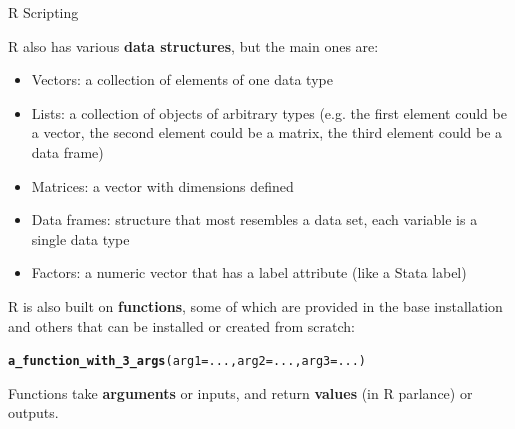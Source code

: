 \documentclass[svgnames,smaller]{beamer}\usepackage[]{graphicx}\usepackage[]{color}
\makeatletter
\newcommand{\hlstd}[1]{\textcolor[rgb]{0.345,0.345,0.345}{#1}}%
\newcommand{\hlkwc}[1]{\textcolor[rgb]{0.333,0.667,0.333}{#1}}%
\newcommand{\hlkwd}[1]{\textcolor[rgb]{0.737,0.353,0.396}{\textbf{#1}}}%
\newenvironment{kframe}{%
 \def\at@end@of@kframe{}%
 \ifinner\ifhmode%
  \def\at@end@of@kframe{\end{minipage}}%
  \begin{minipage}{\columnwidth}%
 \fi\fi%
 \def\FrameCommand##1{\hskip\@totalleftmargin \hskip-\fboxsep
 \colorbox{shadecolor}{##1}\hskip-\fboxsep
     \hskip-\linewidth \hskip-\@totalleftmargin \hskip\columnwidth}%
 \MakeFramed {\advance\hsize-\width
   \@totalleftmargin\z@ \linewidth\hsize
   \@setminipage}}%
 {\par\unskip\endMakeFramed%
 \at@end@of@kframe}
\newenvironment{knitrout}{}{} %
\makeatother
\begin{document}
\begin{frame}[fragile]{R Scripting}

R also has various \textbf{data structures}, but the main ones are:
\begin{itemize}
    \item Vectors: a collection of elements of one data type
    \item Lists: a collection of objects of arbitrary types (e.g. the first element could be a vector, the second element could be a matrix, the third element could be a data frame)
    \item Matrices: a vector with dimensions defined
    \item Data frames: structure that most resembles a data set, each variable is a single data type
    \item Factors: a numeric vector that has a label attribute (like a Stata label)
\end{itemize}


R is also built on \textbf{functions}, some of which are provided in the base installation and others that can be installed or created from scratch:

\begin{knitrout}\scriptsize
{}\color{fgcolor}\begin{kframe}
\begin{alltt}
\hlkwd{a_function_with_3_args}\hlstd{(}\hlkwc{arg1} \hlstd{= ...,} \hlkwc{arg2} \hlstd{= ...,} \hlkwc{arg3} \hlstd{= ...)}
\end{alltt}
\end{kframe}
\end{knitrout}
Functions take \textbf{arguments} or inputs, and return \textbf{values} (in R parlance) or outputs. 

\end{frame}


\end{document}
